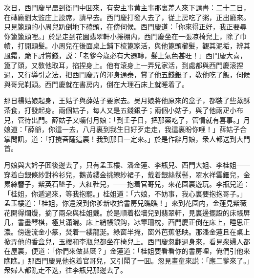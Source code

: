 次日，西門慶早晨到衙門中囬來，有安主事黄主事那裏差人來下請書：二十二日，在磚廠劉太監庄上設席，請早去。西門慶打發人去了，従上房吃了粥，正出廳來。只見篦頭的小周兒趴倒地下磕頭，在傍伺候。西門慶道：「你來得正好，我正要尋你篦篦頭哩。」於是走到花園翡翠軒小捲棚内，西門慶坐在一張凉椅兒上，除了巾幘，打開頭髮。小周兒在後面桌上鋪下梳篦家活，與他篦頭櫛髮，觀其泥垢，辨其風霜，跪下討賞錢，説：「老爹今歲必有大遷轉，髮上氣色甚旺！」西門慶大喜，篦了頭，又敎他取耳，掐捏身上。他有滚身上一弄兒家活，到處都與西門慶滚捏過，又行導引之法，把西門慶弄的渾身通泰，賞了他五錢銀子，敎他吃了飯，伺候與哥兒剃頭。西門慶就在書房内，倒在大理石床上就睡着了。

那日楊姑娘起身，王姑子與薛姑子要家去。吴月娘將他原來的盒子，都裝了些蒸酥茶食，打發起身。兩個姑子，每人又是五錢銀子；兩個小姑子，與了他兩疋小布兒，管待出門。薛姑子又囑付月娘：「到壬子日，把那薬吃了，管情就有喜事。」月娘道：「薛爺，你這一去，八月裏到我生日好歹走走，我這裏盼你哩！」薛姑子合掌問訊，道：「打攪菩薩這裏！我到那日一定來。」於是作辭月娘，衆人都送到大門首。

月娘與大妗子囬後邊去了，只有孟玉樓、潘金蓮、李瓶兒、西門大姐、李桂姐——穿着白銀條紗對衿衫兒，鵝黃縷金挑線紗裙子，戴着銀絲䯼髻，翠水祥雲鈿兒，金累絲簪子，紫英石墜子，大紅鞋兒，——抱着官哥兒，來花園裏遊玩。李瓶兒道：「桂姐，你遞過來，等我抱罷。」桂姐道：「六娘，不妨事，我心裏要抱抱哥子。」孟玉樓道：「桂姐，你還沒到你爹新收拾書房兒瞧瞧！」來到花園内，金蓮見紫薇花開得爛熳，摘了兩朵與桂姐戴。於是順着松墻兒到翡翠軒，見裏邊擺設的床帳屏几，書畫琴棋，極其瀟灑。床上綃帳銀鈎，冰簟珊枕，西門慶正倒在床上，睡思正濃。傍邊流金小篆，焚着一縷龍涎。綠窗半掩，窗外芭蕉低映。那潘金蓮且在桌上掀弄他的香盒兒，玉樓和李瓶兒都坐在椅兒上。西門慶忽翻過身來，看見衆婦人都在屋裏，便道：「你們來做甚麽？」金蓮道：「桂姐要看看你的書房哩，俺們引他來瞧瞧。」那西門慶見他抱着官哥兒，又引鬦了一囬。忽見畫童來説：「應二爹來了。」衆婦人都亂走不迭，往李瓶兒那邊去了。

